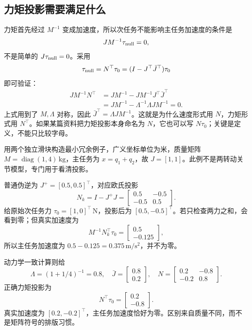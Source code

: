 \subsection{力矩投影需要满足什么}

力矩首先经过 $M^{-1}$ 变成加速度，所以次任务不能影响主任务加速度的条件是
\[
JM^{-1}\tau_{\rm null}=0,
\]
不是简单的 $J\tau_{\rm null}=0$。采用
\begin{equation}
\tau_{\rm null}=N^\top\tau_0
=(I-J^\top\bar J^\top)\tau_0
\label{eq:cf_null_torque}
\end{equation}
即可验证：
\begin{align}
JM^{-1}N^\top
&=JM^{-1}-JM^{-1}J^\top\bar J^\top\\
&=JM^{-1}-\Lambda^{-1}\Lambda JM^{-1}=0.
\end{align}
上式用到了 $M,\Lambda$ 对称，因此 $\bar J^\top=\Lambda JM^{-1}$。这就是为什么速度形式用 $N$，力矩形式用 $N^\top$。如果某篇资料把力矩投影本身命名为 $N$，它也可以写 $N\tau_0$；关键是定义，不能只比较字母。

\begin{examplebox}[算例 16B 普通投影为什么会在主任务上漏出加速度]
用两个独立滑块构造最小冗余例子，广义坐标单位为米，质量矩阵 $M=\operatorname{diag}(1,4)\,\mathrm{kg}$，主任务为 $x=q_1+q_2$，故 $J=[1,1]$。此例不是两转动关节模型，专门用于看清投影。

普通伪逆为 $J^+=[0.5,0.5]^\top$，对应欧氏投影
\[
N_k=I-J^+J=\begin{bmatrix}0.5&-0.5\\-0.5&0.5\end{bmatrix}.
\]
给原始次任务力 $\tau_0=[1,0]^\top\,\mathrm{N}$，投影后为 $[0.5,-0.5]^\top$。若只检查两力之和，会看到零；但真实加速度为
\[
M^{-1}N_k^\top\tau_0=
\begin{bmatrix}0.5\\-0.125\end{bmatrix},
\]
所以主任务加速度为 $0.5-0.125=0.375\,\mathrm{m/s^2}$，并不为零。

动力学一致计算则给
\[
\Lambda=(1+1/4)^{-1}=0.8,
\quad\bar J=\begin{bmatrix}0.8\\0.2\end{bmatrix},
\quad N=\begin{bmatrix}0.2&-0.8\\-0.2&0.8\end{bmatrix}.
\]
正确力矩投影为
\[
N^\top\tau_0=\begin{bmatrix}0.2\\-0.8\end{bmatrix}.
\]
真实加速度为 $[0.2,-0.2]^\top$，主任务加速度恰好为零。区别来自质量不同，而不是矩阵符号的排版习惯。
\end{examplebox}

